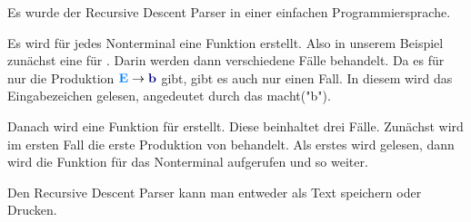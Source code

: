 Es wurde der Recursive Descent Parser in einer einfachen Programmiersprache.

Es wird für jedes Nonterminal eine Funktion erstellt. Also in unserem Beispiel zunächst eine für . Darin werden dann verschiedene Fälle behandelt. Da es für  nur die Produktion $\NonterminalSymbol{E} \to \TerminalSymbol{b}$ gibt, gibt es auch nur einen Fall. In diesem wird das Eingabezeichen  gelesen, angedeutet durch das macht("b").

Danach wird eine Funktion für  erstellt. Diese beinhaltet drei Fälle. Zunächst wird im ersten Fall die erste Produktion von  behandelt. Als erstes wird  gelesen, dann wird die Funktion für das Nonterminal  aufgerufen und so weiter.

Den Recursive Descent Parser kann man entweder als Text speichern oder Drucken.
